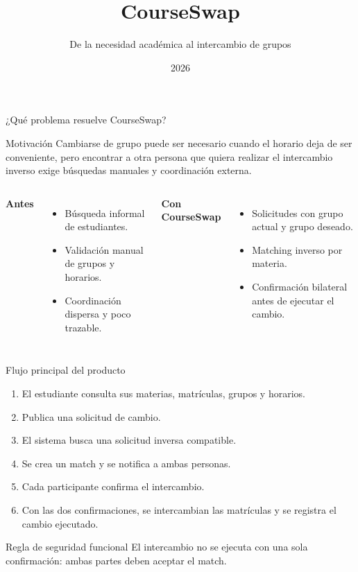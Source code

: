 \documentclass[aspectratio=169,11pt]{beamer}
\title{CourseSwap}
\subtitle{De la necesidad académica al intercambio de grupos}
\author{\texorpdfstring{Entornos de Programación F1\\Alejandro Castro Rondon \and Jonk Keyler Sánchez Pabón \and Juan Carlos Elizalde Padilla}{Entornos de Programación F1 -- CourseSwap}}
\institute{Universidad Industrial de Santander}
\date{2026}
\begin{document}
\begin{frame}
  \titlepage
\end{frame}

\begin{frame}{¿Qué problema resuelve CourseSwap?}
  \begin{block}{Motivación}
    Cambiarse de grupo puede ser necesario cuando el horario deja de ser conveniente,
    pero encontrar a otra persona que quiera realizar el intercambio inverso exige
    búsquedas manuales y coordinación externa.
  \end{block}
  \begin{columns}[T]
      \textbf{Antes}
      \begin{itemize}
        \item Búsqueda informal de estudiantes.
        \item Validación manual de grupos y horarios.
        \item Coordinación dispersa y poco trazable.
      \end{itemize}
      \textbf{Con CourseSwap}
      \begin{itemize}
        \item Solicitudes con grupo actual y grupo deseado.
        \item Matching inverso por materia.
        \item Confirmación bilateral antes de ejecutar el cambio.
      \end{itemize}
  \end{columns}
\end{frame}

\begin{frame}{Flujo principal del producto}
  \begin{enumerate}
    \item El estudiante consulta sus materias, matrículas, grupos y horarios.
    \item Publica una solicitud de cambio.
    \item El sistema busca una solicitud inversa compatible.
    \item Se crea un match y se notifica a ambas personas.
    \item Cada participante confirma el intercambio.
    \item Con las dos confirmaciones, se intercambian las matrículas y se registra
          el cambio ejecutado.
  \end{enumerate}
  \vspace{0.25cm}
  \begin{alertblock}{Regla de seguridad funcional}
    El intercambio no se ejecuta con una sola confirmación: ambas partes deben
    aceptar el match.
  \end{alertblock}
\end{frame}
\end{document}
